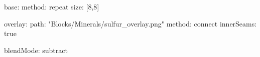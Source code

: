 base:
  method: repeat
  size: [8,8]

overlay:
  path: "Blocks/Minerals/sulfur_overlay.png"
  method: connect
  innerSeams: true

blendMode: subtract
